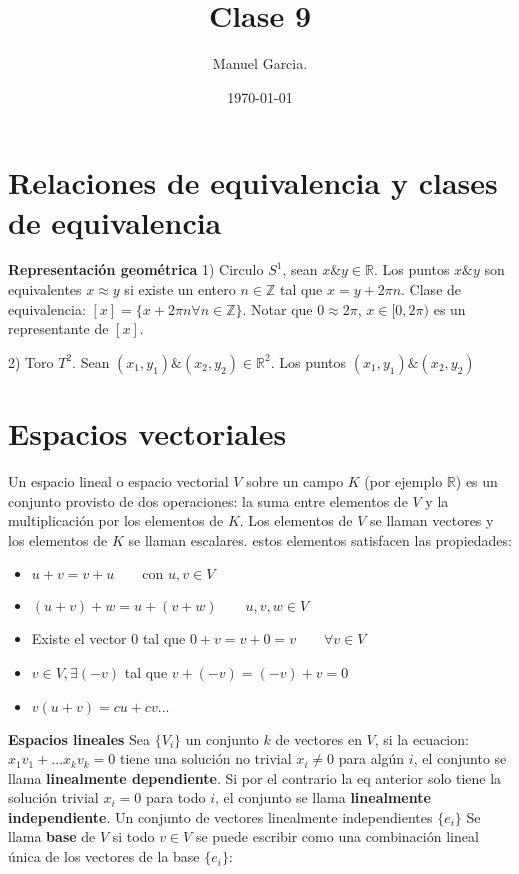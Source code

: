 \documentclass{article}
\title{Clase 9 }
\author{Manuel Garcia.}
\date{\today}
\newcommand{\caja}[3]{%
  \begin{tcolorbox}[colback=#1!5!white,colframe=#1!25!black,title=#2]
    #3
  \end{tcolorbox}%
}
\begin{document}
\maketitle

\section{Relaciones de equivalencia y clases de equivalencia }
\textbf{Representación geométrica }
1) Circulo $ S ^ {1 } $, sean $ x \& y \in \mathbb{R} $. Los puntos $ x \& y  $ son equivalentes $ x \approx y  $ si existe un entero $ n\in \mathbb{Z } $ tal que $ x = y + 2 \pi n  $. Clase de equivalencia: $ [x] = \{x + 2 \pi n \forall n \in \mathbb{Z}\} $. Notar que $ 0 \approx 2 \pi  $, $ x \in [0,2\pi) $ es un representante de $ [x ] $.

2) Toro $ T ^2 $. Sean $ (x_1,y_1)\&(x_2,y_2) \in \mathbb{R}^2 $. Los puntos $ (x_1,y_1)\&(x_2,y_2) $


\section{Espacios vectoriales }
\caja{green}{Definicion y propiedades }{
  Un espacio lineal o espacio vectorial $ V  $ sobre un campo $ K  $ (por ejemplo $ \mathbb{R} $) es un conjunto provisto de dos operaciones: la suma entre elementos de $ V  $ y la multiplicación por los elementos de $ K  $. Los elementos de $ V  $ se llaman vectores y los elementos de $ K  $ se llaman escalares. estos elementos satisfacen las propiedades: 
  \begin{itemize}
    \item $ u+v = v+u \qquad \text{con }u, v\in V  $
    \item $ (u + v) + w = u + (v + w ) \qquad u,v,w \in V  $
    \item Existe el vector 0 tal que $ 0 + v = v + 0 = v \qquad \forall v \in V  $
    \item $ v \in V, \exists (-v)  $ tal que $ v + (-v) = (-v) + v = 0  $
    \item $ v( u + v ) = c u + c v ... $
  \end{itemize}
}

\textbf{Espacios lineales } Sea $ \{V_i \} $ un conjunto $ k  $ de vectores en $ V  $, si la ecuacion: $ x_1v_1+...x_kv_k = 0  $ tiene una solución no trivial $ x_i \neq 0  $ para algún $ i  $, el conjunto se llama \textbf{linealmente dependiente}. Si por el contrario la eq anterior solo tiene la solución trivial $ x_ i  = 0  $ para todo $ i  $, el conjunto se llama \textbf{linealmente independiente}.
Un conjunto de vectores linealmente independientes $ \{e_i \} $ Se llama \textbf{base } de $ V  $ si todo $ v \in V  $ se puede escribir como una combinación lineal única de los vectores de la base $ \{e_i \} $:
\end{document}
